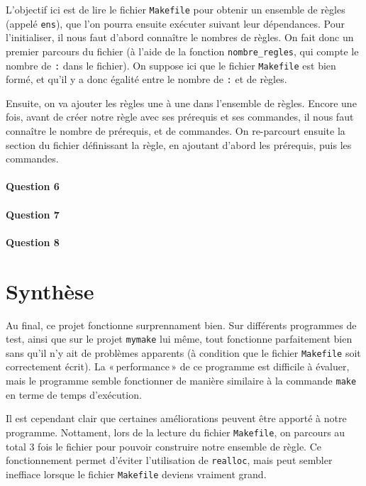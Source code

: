 \documentclass{article}
\begin{document}
L’objectif ici est de lire le fichier \texttt{Makefile} pour obtenir un ensemble de règles (appelé \texttt{ens}), que l’on pourra ensuite exécuter suivant leur dépendances. Pour l'initialiser, il nous faut d’abord connaître le nombres de règles. On fait donc un premier parcours du fichier (à l’aide de la fonction \texttt{nombre\_regles}, qui compte le nombre de \texttt{:} dans le fichier). On suppose ici que le fichier \texttt{Makefile} est bien formé, et qu'il y a donc égalité entre le nombre de \texttt{:} et de règles.

Ensuite, on va ajouter les règles une à une dans l’ensemble de règles. Encore une fois, avant de créer notre règle avec ses prérequis et ses commandes, il nous faut connaître le nombre de prérequis, et de commandes. On re-parcourt ensuite la section du fichier définissant la règle, en ajoutant d’abord les prérequis, puis les commandes.

\paragraph{Question 6}

\paragraph{Question 7}

\paragraph{Question 8}

\section{Synthèse}

Au final, ce projet fonctionne surprennament bien. Sur différents programmes de test, ainsi que sur le projet \texttt{mymake} lui même, tout fonctionne parfaitement bien sans qu’il n’y ait de problèmes apparents (à condition que le fichier \texttt{Makefile} soit correctement écrit). La « performance » de ce programme est difficile à évaluer, mais le programme semble fonctionner de manière similaire à la commande \texttt{make} en terme de temps d’exécution.

Il est cependant clair que certaines améliorations peuvent être apporté à notre programme. Nottament, lors de la lecture du fichier \texttt{Makefile}, on parcours au total 3 fois le fichier pour pouvoir construire notre ensemble de règle. Ce fonctionnement permet d’éviter l’utilisation de \texttt{realloc}, mais peut sembler ineffiace lorsque le fichier \texttt{Makefile} deviens vraiment grand.
\end{document}
